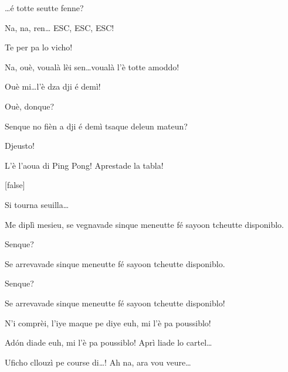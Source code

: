 \begin{drama}

\Treisouspeaks{} \ldots é totte seutte fenne?

\Tuenospeaks Na, na, ren\ldots {} ESC, ESC, ESC!

\Treisouspeaks Te per pa lo vicho!

\Tuenospeaks{} Na, ouè, voualà lèi sen\ldots voualà l'è totte amoddo!


\Treisouspeaks Ouè mi\ldots l'è dza dji é demì!

\Richardspeaks Ouè, donque?

\Treisouspeaks{} Senque no fièn a dji é demì tsaque deleun mateun?

\Tcheuttespeaks Djeusto!

\Treisouspeaks L’è l’aoua di Ping Pong! Aprestade la tabla!
 

[false]



\Genespeaks Si tourna seuilla\ldots

\Sandrinospeaks Me diplì mesieu, se vegnavade sinque meneutte fé sa\-yo\-on tcheutte disponiblo.

\Genespeaks Senque?

\Sandrinospeaks Se arrevavade sinque meneutte fé sayoon tcheutte disponiblo.

\Genespeaks Senque?

\Sandrinospeaks{} Se arrevavade sinque meneutte fé sayoon tcheutte disponiblo!

\Genespeaks{} N'i comprèi, l'iye maque pe diye \og euh, mi l'è pa poussiblo\fg!

\Sandrinospeaks Ad\'on diade \og euh, mi l'è pa poussiblo\fg! Aprì liade lo cartel\ldots

\Genespeaks{} Uficho cllouzì pe course di\ldots! Ah na, ara vou veure\ldots


\end{drama}
